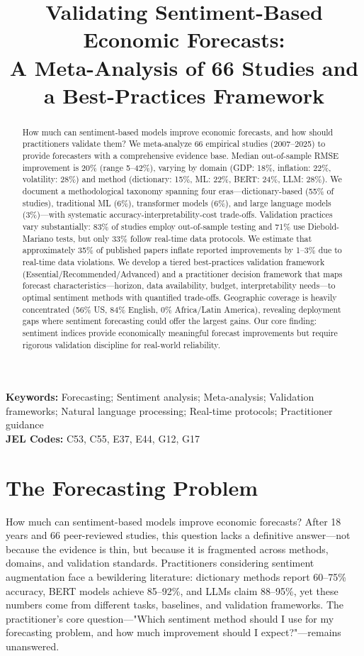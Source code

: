 \documentclass[11pt]{article}
\title{\textbf{Validating Sentiment-Based Economic Forecasts:\\
A Meta-Analysis of 66 Studies and a Best-Practices Framework}}
\author{} %
\date{}
\begin{document}
\maketitle

\begin{abstract}
How much can sentiment-based models improve economic forecasts, and how should practitioners validate them? We meta-analyze 66 empirical studies (2007--2025) to provide forecasters with a comprehensive evidence base. Median out-of-sample RMSE improvement is 20\% (range 5--42\%), varying by domain (GDP: 18\%, inflation: 22\%, volatility: 28\%) and method (dictionary: 15\%, ML: 22\%, BERT: 24\%, LLM: 28\%). We document a methodological taxonomy spanning four eras---dictionary-based (55\% of studies), traditional ML (6\%), transformer models (6\%), and large language models (3\%)---with systematic accuracy-interpretability-cost trade-offs. Validation practices vary substantially: 83\% of studies employ out-of-sample testing and 71\% use Diebold-Mariano tests, but only 33\% follow real-time data protocols. We estimate that approximately 35\% of published papers inflate reported improvements by 1--3\% due to real-time data violations. We develop a tiered best-practices validation framework (Essential/Recommended/Advanced) and a practitioner decision framework that maps forecast characteristics---horizon, data availability, budget, interpretability needs---to optimal sentiment methods with quantified trade-offs. Geographic coverage is heavily concentrated (56\% US, 84\% English, 0\% Africa/Latin America), revealing deployment gaps where sentiment forecasting could offer the largest gains. Our core finding: sentiment indices provide economically meaningful forecast improvements but require rigorous validation discipline for real-world reliability.
\end{abstract}

\noindent \textbf{Keywords:} Forecasting; Sentiment analysis; Meta-analysis; Validation frameworks; Natural language processing; Real-time protocols; Practitioner guidance \\
\textbf{JEL Codes:} C53, C55, E37, E44, G12, G17

\section{The Forecasting Problem}

How much can sentiment-based models improve economic forecasts? After 18 years and 66 peer-reviewed studies, this question lacks a definitive answer---not because the evidence is thin, but because it is fragmented across methods, domains, and validation standards. Practitioners considering sentiment augmentation face a bewildering literature: dictionary methods report 60--75\% accuracy, BERT models achieve 85--92\%, and LLMs claim 88--95\%, yet these numbers come from different tasks, baselines, and validation frameworks. The practitioner's core question---"Which sentiment method should I use for my forecasting problem, and how much improvement should I expect?"---remains unanswered.
\end{document}
